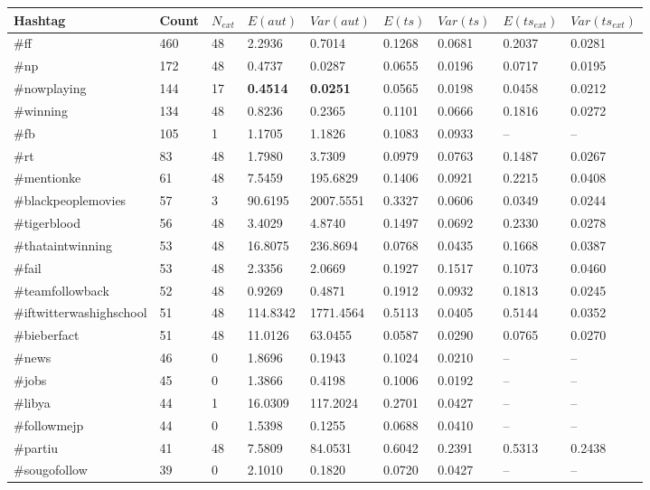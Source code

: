 \documentclass{llncs}
\begin{document}
\begin{table}[ht*]
\centering
\small
\begin{tabular}{ l|l|l|l|l|l|l|l|l }
Hashtag & Count & $N_{ext}$ & $E(aut)$ & $Var(aut)$ & $E(ts)$ & $Var(ts)$ & $E(ts_{ext})$ & $Var(ts_{ext})$\\
\hline
\#ff &     460 & 48 & 2.2936 & 0.7014 & 0.1268 & 0.0681 & 0.2037 & 0.0281 \\
\#np &     172 & 48 & 0.4737 & 0.0287 & 0.0655 & 0.0196 & 0.0717 & 0.0195\\
\#nowplaying & 144 & 17 & \textbf{0.4514} & \textbf{0.0251} & 0.0565 & 0.0198 & 0.0458 & 0.0212 \\
\#winning &     134 & 48 & 0.8236 & 0.2365 & 0.1101 & 0.0666 & 0.1816 & 0.0272 \\
\#fb & 105 & 1 & 1.1705 & 1.1826 & 0.1083 & 0.0933 & -- & -- \\
\#rt & 83 & 48 & 1.7980 & 3.7309 & 0.0979 & 0.0763 & 0.1487 & 0.0267 \\
\#mentionke & 61 & 48 & 7.5459 & 195.6829 & 0.1406 & 0.0921 & 0.2215 & 0.0408 \\
\#blackpeoplemovies & 57 & 3 & 90.6195 & 2007.5551 & 0.3327 & 0.0606 & 0.0349 & 0.0244\\
\#tigerblood & 56 & 48 & 3.4029 & 4.8740 & 0.1497 & 0.0692 & 0.2330 & 0.0278 \\
\#thataintwinning & 53 & 48 & 16.8075 & 236.8694 & 0.0768 & 0.0435 & 0.1668 & 0.0387 \\
\#fail & 53 & 48 & 2.3356 & 2.0669 & 0.1927 & 0.1517 & 0.1073 & 0.0460 \\
\#teamfollowback & 52 & 48 & 0.9269 & 0.4871 & 0.1912 & 0.0932 & 0.1813 & 0.0245 \\
\#iftwitterwashighschool & 51 & 48 & 114.8342 & 1771.4564 & 0.5113 & 0.0405 & 0.5144 & 0.0352 \\
\#bieberfact & 51 & 48 & 11.0126 & 63.0455 & 0.0587 & 0.0290 & 0.0765 & 0.0270 \\
\#news & 46 & 0 & 1.8696 & 0.1943 & 0.1024 & 0.0210 & -- & --  \\
\#jobs & 45 & 0 & 1.3866 & 0.4198 & 0.1006 & 0.0192 & -- & -- \\
\#libya & 44 & 1 & 16.0309 & 117.2024 & 0.2701 & 0.0427 & -- & -- \\
\#followmejp & 44 & 0	& 1.5398 & 0.1255 & 0.0688 & 0.0410 & -- & --\\
\#partiu & 41 & 48 & 7.5809 & 84.0531 & 0.6042 & 0.2391 & 0.5313 & 0.2438 \\
\#sougofollow & 39 & 0 & 2.1010 & 0.1820 & 0.0720 & 0.0427 & -- & -- \\

\end{tabular}
\end{table}
\end{document}
